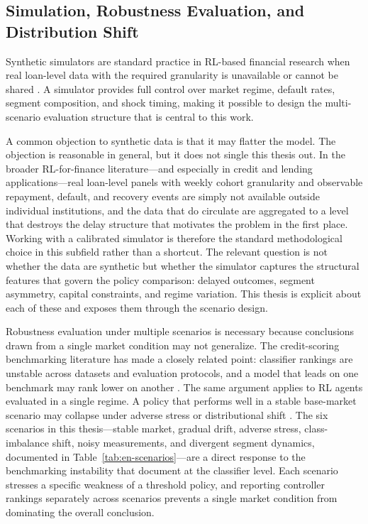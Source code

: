 \documentclass[12pt,a4paper]{article}
\begin{document}
\subsection{Simulation, Robustness Evaluation, and Distribution Shift}

Synthetic simulators are standard practice in RL-based financial research when real loan-level data with the required granularity is unavailable or cannot be shared \cite{herasymovych2019}. A simulator provides full control over market regime, default rates, segment composition, and shock timing, making it possible to design the multi-scenario evaluation structure that is central to this work.

A common objection to synthetic data is that it may flatter the model. The objection is reasonable in general, but it does not single this thesis out. In the broader RL-for-finance literature---and especially in credit and lending applications---real loan-level panels with weekly cohort granularity and observable repayment, default, and recovery events are simply not available outside individual institutions, and the data that do circulate are aggregated to a level that destroys the delay structure that motivates the problem in the first place. Working with a calibrated simulator is therefore the standard methodological choice in this subfield rather than a shortcut. The relevant question is not whether the data are synthetic but whether the simulator captures the structural features that govern the policy comparison: delayed outcomes, segment asymmetry, capital constraints, and regime variation. This thesis is explicit about each of these and exposes them through the scenario design.

Robustness evaluation under multiple scenarios is necessary because conclusions drawn from a single market condition may not generalize. The credit-scoring benchmarking literature has made a closely related point: classifier rankings are unstable across datasets and evaluation protocols, and a model that leads on one benchmark may rank lower on another \cite{lessmann2015, baesens2003}. The same argument applies to RL agents evaluated in a single regime. A policy that performs well in a stable base-market scenario may collapse under adverse stress or distributional shift \cite{bellotti2009}. The six scenarios in this thesis---stable market, gradual drift, adverse stress, class-imbalance shift, noisy measurements, and divergent segment dynamics, documented in Table~\ref{tab:en-scenarios}---are a direct response to the benchmarking instability that \cite{lessmann2015} document at the classifier level. Each scenario stresses a specific weakness of a threshold policy, and reporting controller rankings separately across scenarios prevents a single market condition from dominating the overall conclusion.
\end{document}
